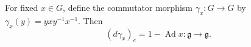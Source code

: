 For fixed $x \in G$, define the commutator morphism $\gamma_x: G \to G$ by $\gamma_x(y) = y x y^{-1} x^{-1}$. Then
$$(d\gamma_x)_e = 1 - \operatorname{Ad} x: \mathfrak{g} \to \mathfrak{g}.$$

